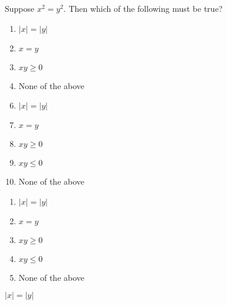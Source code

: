 


  Suppose $x^{2}=y^{2}$. Then which of the following must be true?



\ifsat
	\begin{enumerate}[label=\Alph*)]
		\item    $|x|=|y|$ %
		\item  $x=y$
		\item $xy\geq 0$
		\item  None of the above 
	\end{enumerate}
\else
\fi

\ifacteven
	\begin{enumerate}[label=\textbf{\Alph*.},itemsep=\fill,align=left]
		\setcounter{enumii}{5}
		\item    $|x|=|y|$ %
		\item  $x=y$
		\item $xy\geq 0$
		\addtocounter{enumii}{1}
		\item  $xy\leq 0$
		\item  None of the above 
	\end{enumerate}
\else
\fi

\ifactodd
	\begin{enumerate}[label=\textbf{\Alph*.},itemsep=\fill,align=left]
		\item    $|x|=|y|$ %
		\item  $x=y$
		\item $xy\geq 0$
		\item  $xy\leq 0$
		\item  None of the above 
	\end{enumerate}
\else
\fi

\ifgridin
    $|x|=|y|$ %
		
\else
\fi

